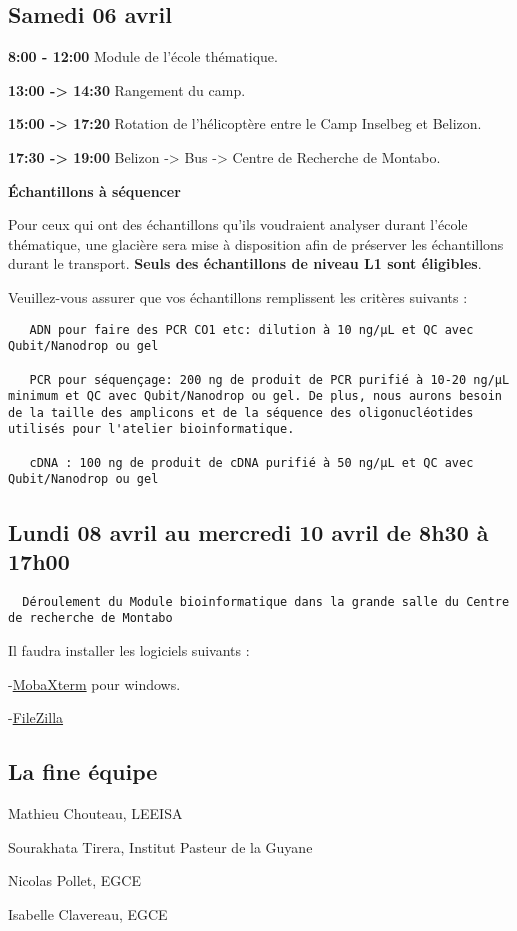 \documentclass[
]{article}
\begin{document}
\hypertarget{samedi-06-avril}{%
\subsection{Samedi 06 avril}\label{samedi-06-avril}}

\textbf{8:00 - 12:00} Module de l'école thématique.

\textbf{13:00 -\textgreater{} 14:30} Rangement du camp.

\textbf{15:00 -\textgreater{} 17:20} Rotation de l'hélicoptère entre le
Camp Inselbeg et Belizon.

\textbf{17:30 -\textgreater{} 19:00} Belizon -\textgreater{} Bus
-\textgreater{} Centre de Recherche de Montabo.

\textbf{Échantillons à séquencer}

Pour ceux qui ont des échantillons qu'ils voudraient analyser durant
l'école thématique, une glacière sera mise à disposition afin de
préserver les échantillons durant le transport. \textbf{Seuls des
échantillons de niveau L1 sont éligibles}.

Veuillez-vous assurer que vos échantillons remplissent les critères
suivants :

\begin{verbatim}
   ADN pour faire des PCR CO1 etc: dilution à 10 ng/µL et QC avec Qubit/Nanodrop ou gel

   PCR pour séquençage: 200 ng de produit de PCR purifié à 10-20 ng/µL minimum et QC avec Qubit/Nanodrop ou gel. De plus, nous aurons besoin de la taille des amplicons et de la séquence des oligonucléotides utilisés pour l'atelier bioinformatique.

   cDNA : 100 ng de produit de cDNA purifié à 50 ng/µL et QC avec Qubit/Nanodrop ou gel
\end{verbatim}

\hypertarget{lundi-08-avril-au-mercredi-10-avril-de-8h30-uxe0-17h00}{%
\subsection{Lundi 08 avril au mercredi 10 avril de 8h30 à
17h00}\label{lundi-08-avril-au-mercredi-10-avril-de-8h30-uxe0-17h00}}

\begin{verbatim}
  Déroulement du Module bioinformatique dans la grande salle du Centre de recherche de Montabo
\end{verbatim}

Il faudra installer les logiciels suivants :

-\href{https://mobaxterm.mobatek.net/}{MobaXterm} pour windows.

-\href{https://filezilla-project.org/download.php?type=client}{FileZilla}

\hypertarget{la-fine-uxe9quipe}{%
\subsection{La fine équipe}\label{la-fine-uxe9quipe}}

Mathieu Chouteau, LEEISA

Sourakhata Tirera, Institut Pasteur de la Guyane

Nicolas Pollet, EGCE

Isabelle Clavereau, EGCE
\end{document}
